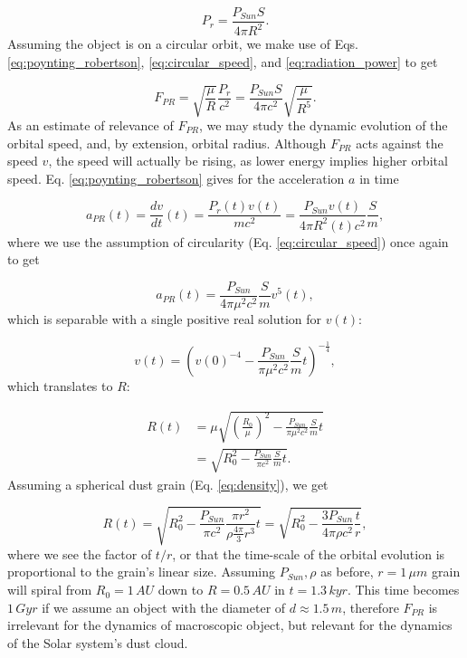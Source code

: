 \begin{equation}
    P_{r} = \frac{P_{Sun} S}{4 \pi R^2}.
    \label{eq:radiation_power}
\end{equation}
Assuming the object is on a circular orbit, we make use of Eqs. \ref{eq:poynting_robertson}, \ref{eq:circular_speed}, and \ref{eq:radiation_power} to get

\begin{equation}
    F_{PR} = \sqrt{\frac{\mu}{R}} \frac{P_{r}}{c^2} = \frac{P_{Sun}S}{4 \pi c^2} \sqrt{\frac{\mu}{R^5}}. 
\end{equation}
As an estimate of relevance of $F_{PR}$, we may study the dynamic evolution of the orbital speed, and, by extension, orbital radius. Although $F_{PR}$ acts against the speed $v$, the speed will actually be rising, as lower energy implies higher orbital speed. Eq. \ref{eq:poynting_robertson} gives for the acceleration $a$ in time

\begin{equation}
    a_{PR}(t) = \frac{dv}{dt}(t) = \frac{P_{r}(t)v(t)}{mc^2} = \frac{P_{Sun} v(t) }{4 \pi R^2(t) c^2} \frac{S}{m},
\end{equation}
where we use the assumption of circularity (Eq. \ref{eq:circular_speed}) once again to get

\begin{equation}
    a_{PR}(t) = \frac{P_{Sun}}{4 \pi \mu^2 c^2} \frac{S}{m} v^5(t),
\end{equation}
which is separable with a single positive real solution for $v(t)$:

\begin{equation}
    v(t) = \left( v(0)^{-4} - \frac{P_{Sun}}{\pi \mu^2 c^2} \frac{S}{m} t \right)^{-\frac{1}{4}},
\end{equation}
which translates to $R$:

\begin{equation}\begin{split}
    R(t) &=  \mu \sqrt{ \left(\frac{R_0}{\mu}\right)^{2} - \frac{P_{Sun}}{\pi \mu^2 c^2} \frac{S}{m} t }
    \\ &= \sqrt{R_0^2 - \frac{P_{Sun}}{\pi c^2} \frac{S}{m} t }.
\end{split}\end{equation}
Assuming a spherical dust grain (Eq. \ref{eq:density}), we get

\begin{equation}
    R(t) = \sqrt{R_0^2 - \frac{P_{Sun}}{\pi c^2} \frac{\pi r^2}{\rho \frac{4\pi}{3} r^3} t } = \sqrt{R_0^2 - \frac{3P_{Sun}}{4 \pi \rho c^2} \frac{t}{r} },
    \label{eq:PR_estimate}
\end{equation}
where we see the factor of $t/r$, or that the time-scale of the orbital evolution is proportional to the grain's linear size. Assuming $P_{Sun},\rho$ as before, $r=1\,\si{\mu m}$ grain will spiral from $R_0=1\,\si{AU}$ down to $R=0.5\,\si{AU}$ in $t=1.3\,\si{kyr}$. This time becomes $1\,\si{Gyr}$ if we assume an object with the diameter of $d \approx 1.5 \, \si{m}$, therefore $F_{PR}$ is irrelevant for the dynamics of macroscopic object, but relevant for the dynamics of the Solar system's dust cloud. 

